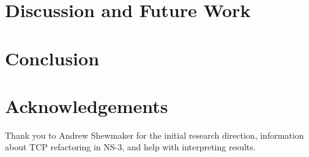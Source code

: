 \documentclass[conference]{IEEEtran}
\begin{document}
\begin{figure}[h!]
\begin{center}
\end{center}
\caption{}
\label{fig:NS2Good}
\end{figure}

\section{Discussion and Future Work} 

\section{Conclusion} 

\section{Acknowledgements}

Thank you to Andrew Shewmaker for the initial research direction, information about TCP refactoring in NS-3, and help with interpreting results. 

{\small {}
}
\end{document}
